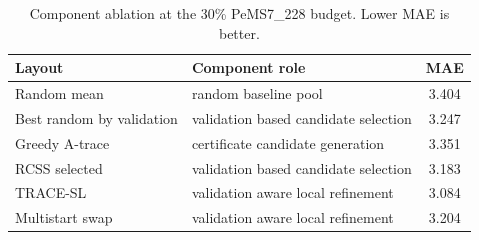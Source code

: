 \begin{table}[pos=htbp]
\centering
\caption{Component ablation at the 30\% PeMS7\_228 budget. Lower MAE is better.}
\label{tab:ablation}
\small
\begin{tabular}{llc}
\toprule
Layout & Component role & MAE \\
\midrule
Random mean & random baseline pool & 3.404 \\
Best random by validation & validation based candidate selection & 3.247 \\
Greedy A-trace & certificate candidate generation & 3.351 \\
RCSS selected & validation based candidate selection & 3.183 \\
TRACE-SL & validation aware local refinement & 3.084 \\
Multistart swap & validation aware local refinement & 3.204 \\
\bottomrule
\end{tabular}
\end{table}
